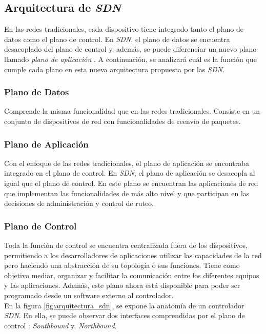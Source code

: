 \subsection{Arquitectura de \textit{SDN}}
En las redes tradicionales, cada dispositivo tiene integrado tanto el plano de datos como el plano de control. En \textit{SDN}, el plano de datos se encuentra desacoplado del plano de control y, además, se puede diferenciar un nuevo plano llamado \textit{plano de aplicación} \parencite{onfsdnarq}. A continuación, se analizará cuál es la función que cumple cada plano en esta nueva arquitectura propuesta por las \textit{SDN}.

\subsubsection{Plano de Datos}
Comprende la misma funcionalidad que en las redes tradicionales. Consiste en un conjunto de dispositivos de red con funcionalidades de reenvío de paquetes.

\subsubsection{Plano de Aplicación}
Con el enfoque de las redes tradicionales, el plano de aplicación se encontraba integrado en el plano de control. En \textit{SDN}, el plano de aplicación se desacopla al igual que el plano de control. En este plano se encuentran las aplicaciones de red que implementan las funcionalidades de más alto nivel y que participan en las decisiones de administración y control de ruteo.

\subsubsection{Plano de Control}
Toda la función de control se encuentra centralizada fuera de los dispositivos, permitiendo a los desarrolladores de aplicaciones utilizar las capacidades de la red pero haciendo una abstracción de su topología o sus funciones. Tiene como objetivo mediar, organizar y facilitar la comunicación entre los diferentes equipos y las aplicaciones. Además, este plano ahora está disponible para poder ser programado desde un software externo al controlador.
\\

En la figura \ref{fig:arquitectura_sdn}, se expone la anatomía de un controlador \textit{SDN}. En ella, se puede observar dos interfaces comprendidas por el plano de control \parencite{sdnarqsouth}: \textit{Southbound} y, \textit{Northbound}.

